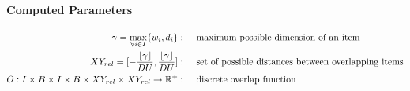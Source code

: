 \paragraph*{Computed Parameters}
\begin{align}
    \gamma = \max_{\forall i \in I}\{ w_i, d_i \}  :\hspace{.5cm}& \text{maximum possible dimension of an item} \notag \\
    XY_{rel} =  [ - \frac{\lfloor \gamma \rfloor}{DU}, \frac{\lfloor \gamma \rfloor}{DU}]  :\hspace{.5cm}& \text{set of possible distances between overlapping items} \notag \\
    O : I \times B \times I \times B \times XY_{rel} \times XY_{rel} \rightarrow \mathbb{R}^+ :\hspace{.5cm}& \text{discrete overlap function} \label{eq:overlap_function}
\end{align}